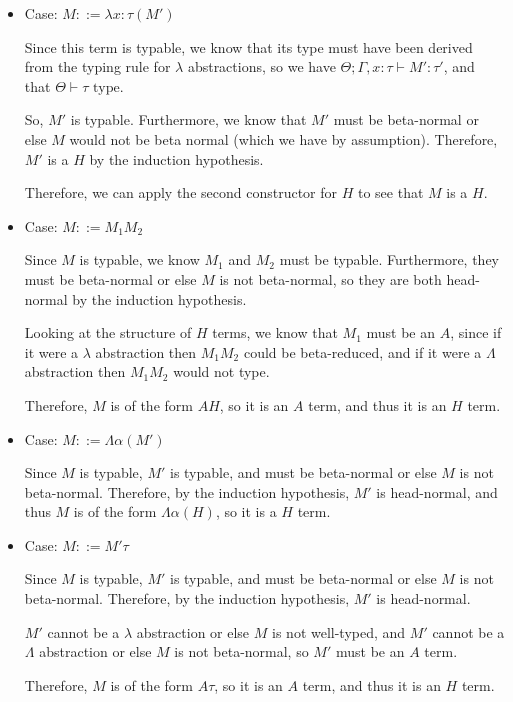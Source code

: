 \documentclass[12pt]{article}
\begin{document}
\begin{enumerate}[label=(\alph*)]
\begin{itemize}
      \item
        Case: $M ::= \lambda x : \tau(M')$

        Since this term is typable, we know that its type must have been derived from the typing rule for $\lambda$ abstractions, so we have $\Theta;\Gamma,x:\tau \vdash M' : \tau'$, and that $\Theta \vdash \tau \text{ type}$.

        So, $M'$ is typable. Furthermore, we know that $M'$ must be beta-normal or else $M$ would not be beta normal (which we have by assumption). Therefore, $M'$ is a $H$ by the induction hypothesis.

        Therefore, we can apply the second constructor for $H$ to see that $M$ is a $H$.

      \item
        Case: $M ::= M_1 M_2$

        Since $M$ is typable, we know $M_1$ and $M_2$ must be typable. Furthermore, they must be beta-normal or else $M$ is not beta-normal, so they are both head-normal by the induction hypothesis.

        Looking at the structure of $H$ terms, we know that $M_1$ must be an $A$, since if it were a $\lambda$ abstraction then $M_1 M_2$ could be beta-reduced, and if it were a $\Lambda$ abstraction then $M_1 M_2$ would not type.

        Therefore, $M$ is of the form $A H$, so it is an $A$ term, and thus it is an $H$ term.

      \item
        Case: $M ::= \Lambda \alpha(M')$

        Since $M$ is typable, $M'$ is typable, and must be beta-normal or else $M$ is not beta-normal. Therefore, by the induction hypothesis, $M'$ is head-normal, and thus $M$ is of the form $\Lambda \alpha(H)$, so it is a $H$ term.

      \item
        Case: $M ::= M' \tau$

        Since $M$ is typable, $M'$ is typable, and must be beta-normal or else $M$ is not beta-normal. Therefore, by the induction hypothesis, $M'$ is head-normal.

        $M'$ cannot be a $\lambda$ abstraction or else $M$ is not well-typed, and $M'$ cannot be a $\Lambda$ abstraction or else $M$ is not beta-normal, so $M'$ must be an $A$ term.

        Therefore, $M$ is of the form $A \tau$, so it is an $A$ term, and thus it is an $H$ term.
    \end{itemize}


\end{enumerate}
\end{document}
